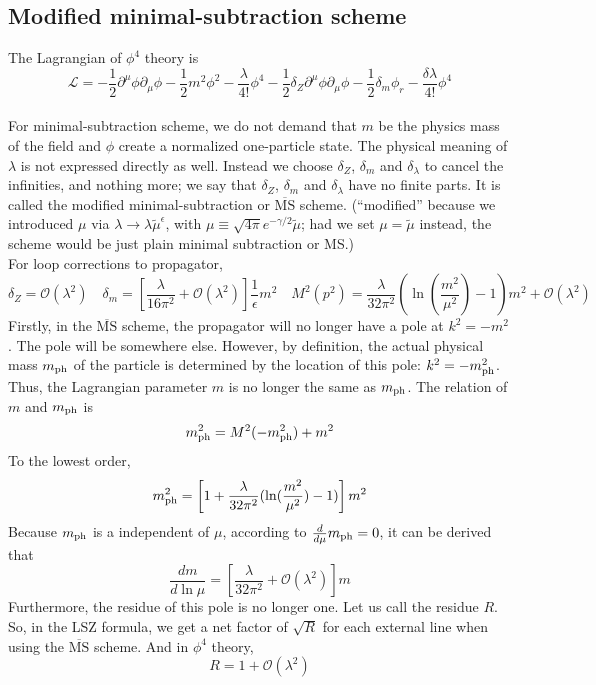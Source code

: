 \subsection{Modified minimal-subtraction scheme}
The Lagrangian of $\phi^4$ theory is
\[\mathcal{L} = -\frac{1}{2} \partial^{\mu} \phi \partial_{\mu} \phi -\frac{1}{2}m^2 \phi^2 - \frac{\lambda}{4!}\phi^4 -\frac{1}{2} \delta_Z \partial^{\mu} \phi \partial_{\mu} \phi -\frac{1}{2}\delta_m \phi_r - \frac{\delta \lambda}{4!}\phi^4\]
\\
For minimal-subtraction scheme, we do not demand that $m$ be the physics mass of the field and $\phi$  create a normalized one-particle state. The physical meaning of $\lambda$ is not expressed directly as well. Instead we choose $\delta_Z$, $\delta_m$ and $\delta_{\lambda}$ to cancel the infinities, and nothing more;
we say that $\delta_Z$, $\delta_m$ and $\delta_{\lambda}$ have no finite parts. It is called the modified minimal-subtraction or $\mathrm{\overline{MS}}$ scheme. (``modified'' because we introduced $\mu$ via  $\lambda \to \lambda \tilde{\mu}^{\epsilon}$, with $\mu \equiv  \sqrt{4\pi} e^{-\gamma/2} \tilde{\mu}$; had we set $\mu = \tilde{\mu}$ instead, the scheme would be just plain minimal subtraction or MS.)
\\
For loop corrections to propagator,
\[\delta_Z=\mathcal{O}(\lambda^2) \quad \delta_m = \left[ \frac{\lambda}{16\pi^2} + \mathcal{O}(\lambda^2) \right]\frac{1}{\epsilon}m^2 \quad M^2(p^2) = \frac{\lambda}{32\pi^2}( \ln(\frac{m^2}{\mu^2})-1)m^2 + \mathcal{O}(\lambda^2)\]
Firstly, in the $\mathrm{\overline{MS}}$ scheme, the propagator will no longer have a pole at $k^2=-m^2$. The pole will be somewhere else. However, by definition, the actual physical mass $m_{\rm ph}$ of the particle is determined by the location of this pole: $k^2 = -m_{\rm ph}^2$. Thus, the Lagrangian parameter $m$ is no longer the same as $m_{\rm ph}$. The relation of $m$ and $m_{\rm ph}$ is 
\[m_{\rm ph}^2 = M^2(-m_{\rm ph}^2) + m^2\]
To the lowest order, 
\[m_{\rm ph}^2 = \left[1+\frac{\lambda}{32\pi^2}( \ln(\frac{m^2}{\mu^2})-1)\right] m^2\]
Because $m_{\rm ph}$ is a independent of $\mu$, according to $\frac{d}{d\mu} m_{\rm ph} = 0$, it can be derived that
\[\frac{dm}{d\ln \mu} = \left[\frac{\lambda}{32\pi^2}+\mathcal{O}(\lambda^2)\right] m\]
Furthermore, the residue of this pole is no longer one. Let us call the residue $R$. So, in the LSZ formula, we get a net factor of $\sqrt{R}$ for each external line when using the $\mathrm{\overline{MS}}$ scheme. And in $\phi^4$ theory,
\[R = 1 + \mathcal{O}(\lambda^2)\]
